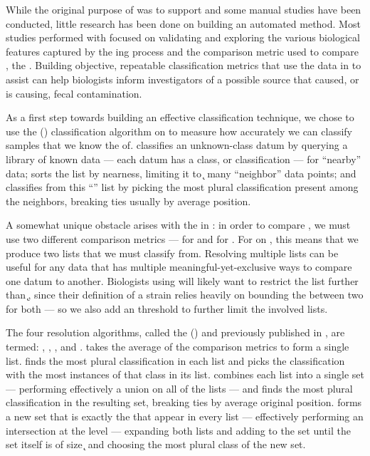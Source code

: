 While the original purpose of \cplop{} was to support \mst{} and some manual \mst{} studies have been conducted, little research has been done on building an automated \mst{} method.
Most studies performed with \cplop{} focused on validating and exploring the various biological features captured by the \pyro{}ing process and the comparison metric used to compare \pyros{}, the \pearson{}.
Building objective, repeatable classification metrics that use the data in \cplop{} to assist \mst{} can help biologists inform investigators of a possible source that caused, or is causing, fecal contamination.


As a first step towards building an effective classification technique, we chose to use the \kNNlong{} (\kNN) classification algorithm on \cplop{} to measure how accurately we can classify samples that we know the \spec{} of.
\kNN{} classifies an unknown-class datum by querying a library of known data --- each datum has a class, or classification --- for ``nearby'' data; sorts the list by nearness, limiting it to \k{} many ``neighbor'' data points; and classifies from this ``\knnlong{}'' list by picking the most plural classification present among the neighbors, breaking ties usually by average position.

A somewhat unique obstacle arises with the \ecoli{} \isols{} in \cplop{}: in order to compare \isols{}, we must use two different comparison metrics --- \pearson{} for \Ssixt{} and \pearson{} for \Sfive{}.
For \kNN{} on \cplop{} \ecoli{} \isols{}, this means that we produce two \knnlong{} lists that we must classify from.
Resolving multiple \kNN{} lists can be useful for any data that has multiple meaningful-yet-exclusive ways to compare one datum to another.
Biologists using \kNN{} will likely want to restrict the list further than \k{}, since their definition of a strain relies heavily on bounding the \pearson{} between two \isols{} for both \itsshort{} --- so we also add an \a{} threshold to further limit the involved \kNN{} lists.

The four resolution algorithms, called the \krapmed{} (\krap{}) and previously published in \cite{DBLP:conf/bibm/McGovernDKBVG15}, are termed: \rmean{}, \rwinner{}, \runion{}, and \rintersect{}.
\rmean{} takes the average of the comparison metrics to form a single \kNN{} list.
\rwinner{} finds the most plural classification in each \kNN{} list and picks the classification with the most instances of that class in its list.
\runion{} combines each \kNN{} list into a single set --- performing effectively a union on all of the \kNN{} lists --- and finds the most plural classification in the resulting set, breaking ties by average original position.
\rintersect{} forms a new set that is exactly the \isols{} that appear in every \kNN{} list --- effectively performing an intersection at the \isol{} level --- expanding both lists and adding to the set until the set itself is of size \k{} and choosing the most plural class of the new set.

